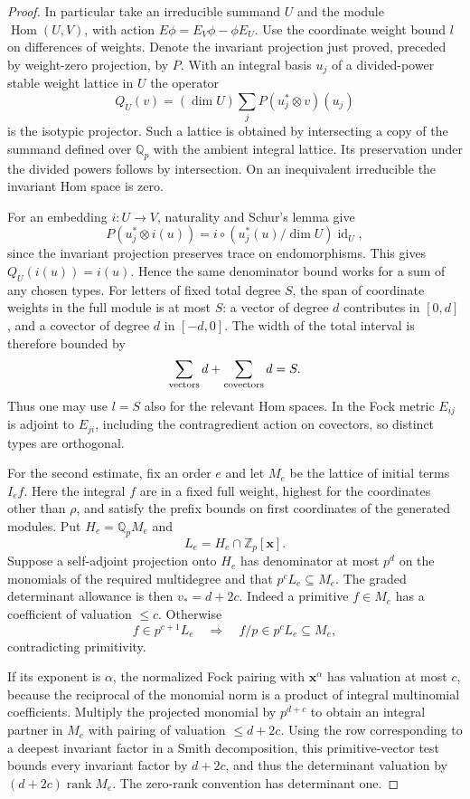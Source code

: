 \begin{proof}
In particular take an irreducible summand \(U\) and the module
\(\operatorname{Hom}(U,V)\), with action
\(E\phi=E_V\phi-\phi E_U\). Use the coordinate weight
bound \(l\) on differences of weights. Denote the invariant
projection just proved, preceded by weight-zero projection,
by \(P\). With an integral basis \(u_j\) of a divided-power
stable weight lattice in \(U\) the operator
\[
     Q_U(v)=(\dim U)\sum_j P(u_j^*\otimes v)(u_j)
\]
is the isotypic projector. Such a lattice is obtained by
intersecting a copy of the summand defined over \(\mathbb Q_p\) with the ambient integral
lattice. Its preservation under the divided powers follows by
intersection. On an inequivalent irreducible the invariant Hom
space is zero.

For an embedding \(i:U\to V\), naturality and
Schur's lemma give
\[
 P(u_j^*\otimes i(u))=i\circ(u_j^*(u)/\dim U)\operatorname{id}_U,
\]
since the invariant projection preserves trace on endomorphisms.
This gives \(Q_U(i(u))=i(u)\). Hence the same denominator bound
works for a sum of any chosen types. For letters of fixed total
degree \(S\), the span of coordinate weights in the full module
is at most \(S\): a vector of degree \(d\) contributes in \([0,d]\), and a covector of degree \(d\) in \([-d,0]\). The width of the total interval is therefore bounded by
\[
 \sum_{\rm vectors} d+\sum_{\rm covectors} d=S.
\]
Thus one may use \(l=S\) also for the relevant Hom spaces.
In the Fock metric \(E_{ij}\) is adjoint to \(E_{ji}\), including
the contragredient action on covectors, so distinct types are
orthogonal.

For the second estimate, fix an order \(e\) and let \(M_e\) be
the lattice of initial terms \(I_e f\). Here the integral \(f\)
are in a fixed full weight, highest for the coordinates other
than \(\rho\), and satisfy the prefix bounds on first coordinates
of the generated modules. Put \(H_e=\mathbb Q_pM_e\) and
\[
 L_e=H_e\cap\mathbb Z_p[\mathbf x].
\]
Suppose a self-adjoint
projection onto \(H_e\) has denominator at most \(p^d\) on
the monomials of the required multidegree and that
\(p^c L_e\subseteq M_e\). The graded determinant allowance
is then \(v_*=d+2c\). Indeed a primitive \(f\in M_e\) has a
coefficient of valuation \(\le c\). Otherwise
\[
 f\in p^{c+1}L_e\quad\Longrightarrow\quad f/p\in p^cL_e\subseteq M_e,
\]
contradicting primitivity.

If its exponent is \(\alpha\),
the normalized Fock pairing with \(\mathbf x^\alpha\) has valuation
at most \(c\), because the reciprocal of the monomial norm is a
product of integral multinomial coefficients. Multiply the
projected monomial by \(p^{d+c}\) to obtain an integral partner
in \(M_e\) with pairing of valuation \(\le d+2c\).
Using the row corresponding to a deepest invariant factor in
a Smith decomposition, this primitive-vector test bounds every
invariant factor by \(d+2c\), and thus the determinant valuation
by \((d+2c)\operatorname{rank}M_e\). The zero-rank convention has
determinant one.

\end{proof}

